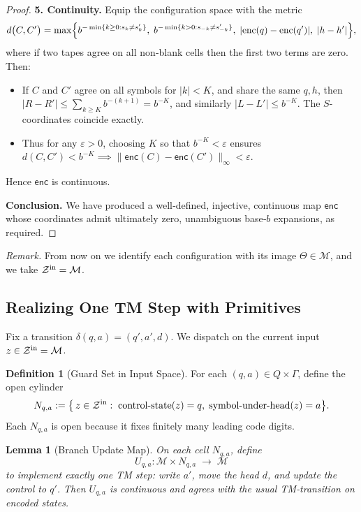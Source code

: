 \documentclass[12pt]{article}
\theoremstyle{definition}
\newtheorem{definition}{Definition}[section]
\theoremstyle{plain}
\newtheorem{lemma}{Lemma}[section]
\begin{document}
\begin{proof}
\medskip
\noindent\textbf{5. Continuity.}
Equip the configuration space with the metric
\[
  d\bigl(C,C'\bigr)
  =\max\Bigl\{
    b^{-\min\{k\ge0:s_k\neq s'_k\}},\;
    b^{-\min\{k>0:s_{-k}\neq s'_{-k}\}},\;
    \lvert\mathrm{enc}(q)-\mathrm{enc}(q')\rvert,\;
    \lvert h-h'\rvert
  \Bigr\},
\]
where if two tapes agree on all non‑blank cells then the first two terms
are zero.  Then:
\begin{itemize}
  \item If \(C\) and \(C'\) agree on all symbols for \(\lvert k\rvert<K\),
    and share the same \(q,h\), then
    \(\lvert R-R'\rvert\le \sum_{k\ge K}\!b^{-(k+1)} = b^{-K}\), and
    similarly \(\lvert L-L'\rvert\le b^{-K}\).  The \(S\)-coordinates
    coincide exactly.  
  \item Thus for any \(\varepsilon>0\), choosing \(K\) so that
    \(b^{-K}<\varepsilon\) ensures 
    \(d(C,C')<b^{-K}\implies\|\mathsf{enc}(C)-\mathsf{enc}(C')\|_\infty<\varepsilon\).
\end{itemize}
Hence \(\mathsf{enc}\) is continuous.

\medskip
\noindent\textbf{Conclusion.}
We have produced a well‑defined, injective, continuous map
\(\mathsf{enc}\) whose coordinates admit ultimately zero, unambiguous
base‑\(b\) expansions, as required.
\end{proof}


\noindent\emph{Remark.}  From now on we identify each configuration with its image \(\Theta\in\mathcal M\), and we take \(\mathcal Z^{\rm in}=\mathcal M\).

\subsection{Realizing One TM Step with Primitives}
\label{subsec:step-realization}

Fix a transition \(\delta(q,a)=(q',a',d)\).  We dispatch on the current input \(z\in\mathcal Z^{\rm in}=\mathcal M\).

\begin{definition}[Guard Set in Input Space]
For each \((q,a)\in Q\times\Gamma\), define the open cylinder
\[
  N_{q,a}
  := \bigl\{\,z\in\mathcal Z^{\rm in}:\;
     \text{control‑state}(z)=q,\;\text{symbol‑under‑head}(z)=a
  \bigr\}.
\]
Each \(N_{q,a}\) is open because it fixes finitely many leading code digits.
\end{definition}

\begin{lemma}[Branch Update Map]
\label{lem:branch-update}
On each cell \(N_{q,a}\), define
\[
  U_{q,a}:\mathcal M\times N_{q,a}\;\longrightarrow\;\mathcal M
\]
to implement exactly one TM step: write \(a'\), move the head \(d\), and update the control to \(q'\).  Then \(U_{q,a}\) is continuous and agrees with the usual TM‐transition on encoded states.
\end{lemma}
\end{document}
